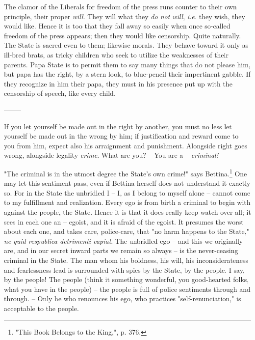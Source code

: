 \documentclass[a4paper]{book}
\begin{document}
The clamor of the Liberals for freedom of the press runs counter to their own 
principle, their proper \textit{will}. They will what they \textit{do not 
will}, \textit{i.e.} they wish, they would like. Hence it is too that they 
fall away so easily when once so-called freedom of the press appears; then 
they would like censorship. Quite naturally. The State is sacred even to them; 
likewise morals. They behave toward it only as ill-bred brats, as tricky 
children who seek to utilize the weaknesses of their parents. Papa State is to 
permit them to say many things that do not please him, but papa has the right, 
by a stern look, to blue-pencil their impertinent gabble. If they recognize in 
him their papa, they must in his presence put up with the censorship of 
speech, like every child.

\begin{center}
--------\end{center}


If you let yourself be made out in the right by another, you must no less let 
yourself be made out in the wrong by him; if justification and reward come to 
you from him, expect also his arraignment and punishment. Alongside right goes 
wrong, alongside legality \textit{crime}. What are you? -- You are a -- 
\textit{criminal!}

"{}The criminal is in the utmost degree the State's own crime!"{} says 
Bettina.\footnote{"{}This Book Belongs to the King,"{}, p. 376.} One may let 
this sentiment pass, even if Bettina herself does not understand it exactly 
so. For in the State the unbridled I -- I, as I belong to myself alone -- 
cannot come to my fulfillment and realization. Every ego is from birth a 
criminal to begin with against the people, the State. Hence it is that it does 
really keep watch over all; it sees in each one an -- egoist, and it is afraid 
of the egoist. It presumes the worst about each one, and takes care, 
police-care, that "{}no harm happens to the State,"{} \textit{ne quid 
respublica detrimenti capiat}. The unbridled ego -- and this we originally 
are, and in our secret inward parts we remain so always -- is the 
never-ceasing criminal in the State. The man whom his boldness, his will, his 
inconsiderateness and fearlessness lead is surrounded with spies by the State, 
by the people. I say, by the people! The people (think it something wonderful, 
you good-hearted folks, what you have in the people) -- the people is full of 
police sentiments through and through. -- Only he who renounces his ego, who 
practices "{}self-renunciation,"{} is acceptable to the people.
\end{document}
